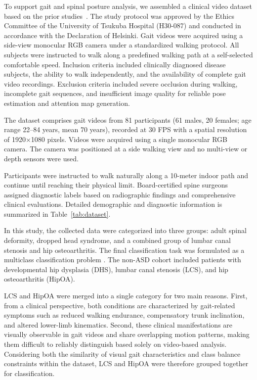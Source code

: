 \documentclass[review,authoryear,times]{elsarticle}
\begin{document}
To support gait and spinal posture analysis, we assembled a clinical video dataset based on the prior studies~\cite{chen2023two, chen2024phasemix}. 
The study protocol was approved by the Ethics Committee of the University of Tsukuba Hospital (H30-087) and conducted in accordance with the Declaration of Helsinki. 
Gait videos were acquired using a side-view monocular RGB camera under a standardized walking protocol. All subjects were instructed to walk along a predefined walking path at a self-selected comfortable speed.
Inclusion criteria included clinically diagnosed disease subjects, the ability to walk independently, and the availability of complete gait video recordings. 
Exclusion criteria included severe occlusion during walking, incomplete gait sequences, and insufficient image quality for reliable pose estimation and attention map generation.

The dataset comprises gait videos from 81 participants (61 males, 20 females; age range 22--84 years, mean 70 years), recorded at 30 FPS with a spatial resolution of 1920$\times$1080 pixels. 
Videos were acquired using a single monocular RGB camera.
The camera was positioned at a side walking view and no multi-view or depth sensors were used.

Participants were instructed to walk naturally along a 10-meter indoor path and continue until reaching their physical limit. 
Board-certified spine surgeons assigned diagnostic labels based on radiographic findings and comprehensive clinical evaluations. 
Detailed demographic and diagnostic information is summarized in Table~\ref{tab:dataset}.

In this study, the collected data were categorized into three groups: adult spinal deformity, dropped head syndrome, and a combined group of lumbar canal stenosis and hip osteoarthritis. 
The final classification task was formulated as a multiclass classification problem .
The non-ASD cohort included patients with developmental hip dysplasia (DHS), lumbar canal stenosis (LCS), and hip osteoarthritis (HipOA).

LCS and HipOA were merged into a single category for two main reasons. 
First, from a clinical perspective, both conditions are characterized by gait-related symptoms such as reduced walking endurance, compensatory trunk inclination, and altered lower-limb kinematics. 
Second, these clinical manifestations are visually observable in gait videos and share overlapping motion patterns, making them difficult to reliably distinguish based solely on video-based analysis. 
Considering both the similarity of visual gait characteristics and class balance constraints within the dataset, LCS and HipOA were therefore grouped together for classification.
\end{document}
